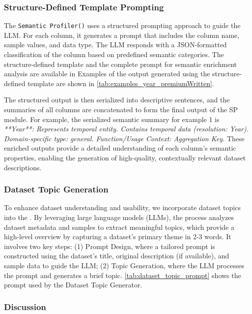 \subsubsection{\textbf{Structure-Defined Template Prompting}}
The \texttt{Semantic Profiler(\semprof)} uses a structured prompting approach to guide the LLM. For each column, it generates a prompt that includes the column name, sample values, and data type. The LLM responds with a JSON-formatted classification of the column based on predefined semantic categories.
% 
The structure-defined template and the complete prompt for semantic enrichment analysis are available in 
% 
%
% 
Examples of the output generated using the structure-defined template are shown in \autoref{tab:examples_year_premiumWritten}.
%



The structured output is then serialized into descriptive sentences, and the summaries of all columns are concatenated to form the final output of the SP module.
% 
For example, the serialized semantic summary for example 1 is \textit{**Year**: Represents temporal entity. Contains temporal data (resolution: Year). Domain-specific type: general. Function/Usage Context: Aggregation Key.}
% 
These enriched outputs provide a detailed understanding of each column's semantic properties, enabling the generation of high-quality, contextually relevant dataset descriptions. 

\subsubsection{\textbf{Dataset Topic Generation}}
To enhance dataset understanding and usability, we incorporate dataset topics into the \semprof. 
% 
By leveraging large language models (LLMs), the process analyzes dataset metadata and samples to extract meaningful topics, which provide a high-level overview by capturing a dataset's primary theme in 2-3 words.
% 
It involves two key steps: (1) Prompt Design, where a tailored prompt is constructed using the dataset's title, original description (if available), and sample data to guide the LLM; (2) Topic Generation, where the LLM processes the prompt and generates a brief topic. \autoref{tab:dataset_topic_prompt} shows the prompt used by the Dataset Topic Generator.

\subsubsection{Discussion}


